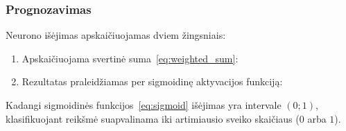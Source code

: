\subsubsection{Prognozavimas}
\label{subsubsec:prognozavimas}

Neurono išėjimas apskaičiuojamas dviem žingsniais:
\begin{enumerate}
    \item Apskaičiuojama svertinė suma~\eqref{eq:weighted_sum}: 
    \item Rezultatas praleidžiamas per sigmoidinę aktyvacijos funkciją: 
\end{enumerate}

Kadangi sigmoidinės funkcijos~\eqref{eq:sigmoid} išėjimas yra intervale $(0; 1)$, klasifikuojant reikšmė suapvalinama iki artimiausio sveiko skaičiaus ($0$ arba $1$).